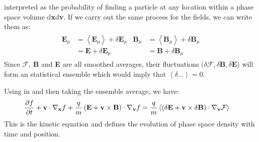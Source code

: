             interpreted as the probability of finding a particle at any location within a phase
            space volume d\textbf{x}d\textbf{v}. If we carry out the same process for the fields, we
            can write them as:
            \begin{align}
                \begin{split}
                    \mathbf{E}_{\mu} & = \left<\mathbf{E}_{\mu}\right> + \delta\mathbf{E}_{\mu} \\
                    & = \mathbf{E} + \delta\mathbf{E}_{\mu}
                \end{split}
                \begin{split}
                    \mathbf{B}_{\mu} & = \left<\mathbf{B}_{\mu}\right> + \delta\mathbf{B}_{\mu} \\
                    & = \mathbf{B} + \delta\mathbf{B}_{\mu}\label{eq:pd2}
                \end{split}
            \end{align}
            Since $\mathcal{F}$, \textbf{B} and \textbf{E} are all smoothed averages, their
            fluctuations $(\delta\mathcal{F}, \delta\mathbf{B}, \delta\mathbf{E}$) will form an
            statistical ensemble which would imply that $\left<\delta ... \right> = 0$.

            Using  in  and then taking the ensemble average, we
            have:
            \begin{align}
                \frac{\partial \mathnormal{f}}{\partial t} + \mathbf{v} \cdot \nabla_{\mathbf{x}}\mathnormal{f} + \frac{q}{m}\left(\mathbf{E} + \mathbf{v} \times \mathbf{B}\right) \cdot \nabla_{\mathbf{v}} \mathnormal{f} & = \frac{q}{m}\left<\left(\delta\mathbf{E} + \mathbf{v} \times \delta \mathbf{B}\right) \cdot \nabla_{\mathbf{v}} \mathcal{F}\right> \label{eq:kint}
            \end{align}
            This is the kinetic equation and defines the evolution of phase space density with time
            and position.

